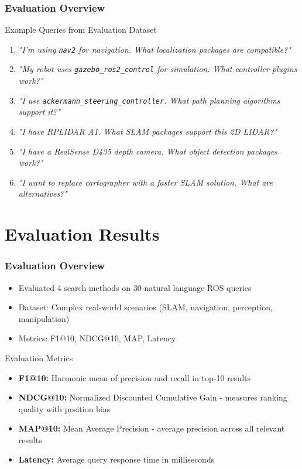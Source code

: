\documentclass{beamer}
\begin{document}
\begin{frame}
  \frametitle{Evaluation Overview}
  \begin{block}{Example Queries from Evaluation Dataset}
  \small
  \begin{enumerate}
    \item \textit{"I'm using \texttt{nav2} for navigation. What localization packages are compatible?"}
    \item \textit{"My robot uses \texttt{gazebo\_ros2\_control} for simulation. What controller plugins work?"}
    \item \textit{"I use \texttt{ackermann\_steering\_controller}. What path planning algorithms support it?"}
    \item \textit{"I have RPLIDAR A1. What SLAM packages support this 2D LIDAR?"}
    \item \textit{"I have a RealSense D435 depth camera. What object detection packages work?"}
    \item \textit{"I want to replace cartographer with a faster SLAM solution. What are alternatives?"}
  \end{enumerate}
  \end{block}
  

\end{frame}





\section{Evaluation Results}

\begin{frame}
  \frametitle{Evaluation Overview}
  \begin{itemize}
    \item Evaluated 4 search methods on 30 natural language ROS queries
    \item Dataset: Complex real-world scenarios (SLAM, navigation, perception, manipulation)
    \item Metrics: F1@10, NDCG@10, MAP, Latency
  \end{itemize}
  
  \vspace{0.5cm}


\begin{block}{Evaluation Metrics}
  \begin{itemize}
    \item \textbf{F1@10:} Harmonic mean of precision and recall in top-10 results
    \item \textbf{NDCG@10:} Normalized Discounted Cumulative Gain - measures ranking quality with position bias
    \item \textbf{MAP@10:} Mean Average Precision - average precision across all relevant results
    \item \textbf{Latency:} Average query response time in milliseconds
  \end{itemize}
  \end{block}
\end{frame}
\end{document}
